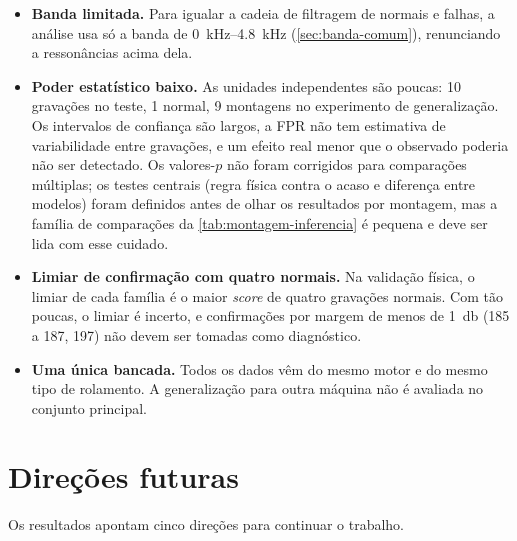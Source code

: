 \begin{itemize}
  gravações de falha (200 e 225) não mostram o defeito declarado nem sob análise
  de envelope~\cite{smith2015}. Acertá-las indicaria um atalho, não diagnóstico.
  \item \textbf{Banda limitada.} Para igualar a cadeia de filtragem de normais e
  falhas, a análise usa só a banda de \SIrange{0}{4.8}{\kilo\hertz}
  (\autoref{sec:banda-comum}), renunciando a ressonâncias acima dela.
  \item \textbf{Poder estatístico baixo.} As unidades independentes são poucas:
  10 gravações no teste, 1 normal, 9 montagens no experimento de generalização.
  Os intervalos de confiança são largos, a FPR não tem estimativa de variabilidade
  entre gravações, e um efeito real menor que o observado poderia não ser
  detectado. Os valores-$p$ não foram corrigidos para comparações múltiplas; os
  testes centrais (regra física contra o acaso e diferença entre modelos) foram
  definidos antes de olhar os resultados por montagem, mas a família de
  comparações da \autoref{tab:montagem-inferencia} é pequena e deve ser lida com
  esse cuidado.
  \item \textbf{Limiar de confirmação com quatro normais.} Na validação física, o
  limiar de cada família é o maior \emph{score} de quatro gravações normais. Com tão
  poucas, o limiar é incerto, e confirmações por margem de menos de
  \SI{1}{\decibel} (185 a 187, 197) não devem ser tomadas como diagnóstico.
  \item \textbf{Uma única bancada.} Todos os dados vêm do mesmo motor e do mesmo
  tipo de rolamento. A generalização para outra máquina não é avaliada no
  conjunto principal.
\end{itemize}

\section{Direções futuras}
\label{sec:trabalhos-futuros}

Os resultados apontam cinco direções para continuar o trabalho.

